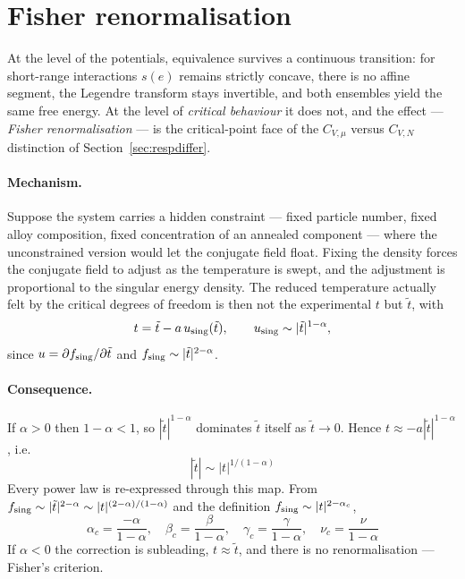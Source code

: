 \documentclass[10pt,a4paper]{article}
\theoremstyle{remark}
\begin{document}
\section{Fisher renormalisation}
\label{app:fisher}

At the level of the potentials, equivalence survives a continuous transition: for
short-range interactions $s(e)$ remains strictly concave, there is no affine
segment, the Legendre transform stays invertible, and both ensembles yield the
same free energy. At the level of \emph{critical behaviour} it does not, and the
effect --- \emph{Fisher renormalisation} --- is the critical-point face of the
$C_{V,\mu}$ versus $C_{V,N}$ distinction of Section~\ref{sec:respdiffer}.

\paragraph{Mechanism.} Suppose the system carries a hidden constraint --- fixed
particle number, fixed alloy composition, fixed concentration of an annealed
component --- where the unconstrained version would let the conjugate field
float. Fixing the density forces the conjugate field to adjust as the temperature
is swept, and the adjustment is proportional to the singular energy density. The
reduced temperature actually felt by the critical degrees of freedom is then not
the experimental $t$ but $\tilde t$, with
\[
t=\tilde t-a\,u_{\rm sing}(\tilde t),
\qquad u_{\rm sing}\sim|\tilde t|^{1-\alpha},
\]
since $u=\partial f_{\rm sing}/\partial\tilde t$ and $f_{\rm sing}\sim|\tilde
t|^{2-\alpha}$.

\paragraph{Consequence.} If $\alpha>0$ then $1-\alpha<1$, so $|\tilde
t|^{1-\alpha}$ dominates $\tilde t$ itself as $\tilde t\to0$. Hence $t\approx
-a|\tilde t|^{1-\alpha}$, i.e.
\[
\;|\tilde t|\sim|t|^{1/(1-\alpha)}\
\]
Every power law is re-expressed through this map. From $f_{\rm sing}\sim
|\tilde t|^{2-\alpha}\sim|t|^{(2-\alpha)/(1-\alpha)}$ and the definition
$f_{\rm sing}\sim|t|^{2-\alpha_c}$,
\[
\;\alpha_c=\frac{-\alpha}{1-\alpha},\quad
\beta_c=\frac{\beta}{1-\alpha},\quad
\gamma_c=\frac{\gamma}{1-\alpha},\quad
\nu_c=\frac{\nu}{1-\alpha}\
\]
If $\alpha<0$ the correction is subleading, $t\approx\tilde t$, and there is no
renormalisation --- Fisher's criterion.
\end{document}

